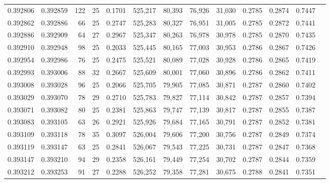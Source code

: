 \begin{tabular}{rrrrrrrrrrrrr}
0.392806 & 0.392859 &   122 &  25 &                                     0.1701 & 525,217 &  80,393 &  76,926 &  31,030 & 0.2785 & 0.2874 & 0.7447 \\
0.392862 & 0.392886 &    66 &  25 &                                     0.2747 & 525,283 &  80,327 &  76,951 &  31,005 & 0.2785 & 0.2872 & 0.7441 \\
0.392886 & 0.392909 &    64 &  27 &                                     0.2967 & 525,347 &  80,263 &  76,978 &  30,978 & 0.2785 & 0.2870 & 0.7435 \\
0.392910 & 0.392948 &    98 &  25 &                                     0.2033 & 525,445 &  80,165 &  77,003 &  30,953 & 0.2786 & 0.2867 & 0.7426 \\
0.392954 & 0.392986 &    76 &  25 &                                     0.2475 & 525,521 &  80,089 &  77,028 &  30,928 & 0.2786 & 0.2865 & 0.7419 \\
0.392993 & 0.393006 &    88 &  32 &                                     0.2667 & 525,609 &  80,001 &  77,060 &  30,896 & 0.2786 & 0.2862 & 0.7411 \\
0.393008 & 0.393028 &    96 &  25 &                                     0.2066 & 525,705 &  79,905 &  77,085 &  30,871 & 0.2787 & 0.2860 & 0.7402 \\
0.393029 & 0.393070 &    78 &  29 &                                     0.2710 & 525,783 &  79,827 &  77,114 &  30,842 & 0.2787 & 0.2857 & 0.7394 \\
0.393071 & 0.393082 &    80 &  25 &                                     0.2381 & 525,863 &  79,747 &  77,139 &  30,817 & 0.2787 & 0.2855 & 0.7387 \\
0.393083 & 0.393105 &    63 &  26 &                                     0.2921 & 525,926 &  79,684 &  77,165 &  30,791 & 0.2787 & 0.2852 & 0.7381 \\
0.393109 & 0.393118 &    78 &  35 &                                     0.3097 & 526,004 &  79,606 &  77,200 &  30,756 & 0.2787 & 0.2849 & 0.7374 \\
0.393119 & 0.393147 &    63 &  25 &                                     0.2841 & 526,067 &  79,543 &  77,225 &  30,731 & 0.2787 & 0.2847 & 0.7368 \\
0.393147 & 0.393210 &    94 &  29 &                                     0.2358 & 526,161 &  79,449 &  77,254 &  30,702 & 0.2787 & 0.2844 & 0.7359 \\
0.393212 & 0.393253 &    91 &  27 &                                     0.2288 & 526,252 &  79,358 &  77,281 &  30,675 & 0.2788 & 0.2841 & 0.7351 \\

\end{tabular}
